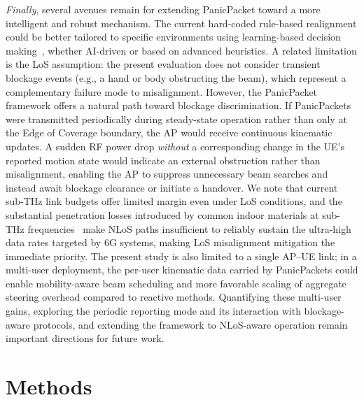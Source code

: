 \documentclass[fleqn,10pt]{wlscirep}
\begin{document}
\emph{Finally}, several avenues remain for extending PanicPacket toward a more intelligent and robust mechanism. The current hard-coded rule-based realignment could be better tailored to specific environments using learning-based decision making~\cite{10036372}, whether AI-driven or based on advanced heuristics. A related limitation is the LoS assumption: the present evaluation does not consider transient blockage events (e.g., a hand or body obstructing the beam), which represent a complementary failure mode to misalignment. However, the PanicPacket framework offers a natural path toward blockage discrimination. If PanicPackets were transmitted periodically during steady-state operation rather than only at the Edge of Coverage boundary, the AP would receive continuous kinematic updates. A sudden RF power drop \emph{without} a corresponding change in the UE's reported motion state would indicate an external obstruction rather than misalignment, enabling the AP to suppress unnecessary beam searches and instead await blockage clearance or initiate a handover. We note that current sub-THz link budgets offer limited margin even under LoS conditions, and the substantial penetration losses introduced by common indoor materials at sub-THz frequencies~\cite{9473898} make NLoS paths insufficient to reliably sustain the ultra-high data rates targeted by 6G systems, making LoS misalignment mitigation the immediate priority. The present study is also limited to a single AP--UE link; in a multi-user deployment, the per-user kinematic data carried by PanicPackets could enable mobility-aware beam scheduling and more favorable scaling of aggregate steering overhead compared to reactive methods. Quantifying these multi-user gains, exploring the periodic reporting mode and its interaction with blockage-aware protocols, and extending the framework to NLoS-aware operation remain important directions for future work.

\section*{Methods}
\end{document}
